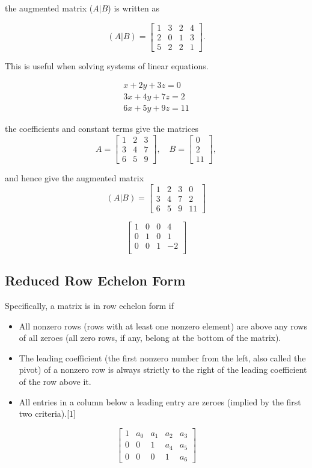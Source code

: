 \documentclass[12pt, a4paper]{article}
\begin{document}
the augmented matrix ($A|B$) is written as

\[
(A|B)=
  \left[\begin{array}{ccc|c}
    1 & 3 & 2 & 4 \\
    2 & 0 & 1 & 3 \\
    5 & 2 & 2 & 1
  \end{array}\right].
\]

This is useful when solving systems of linear equations.


\begin{eqnarray} \nonumber
x + 2y + 3z = 0 \\ \nonumber
3x + 4y + 7z = 2 \\ \nonumber
6x + 5y + 9z = 11 \nonumber
\end{eqnarray}

the coefficients and constant terms give the matrices
\[
A =
\begin{bmatrix}
1 & 2 & 3 \\
3 & 4 & 7 \\
6 & 5 & 9
\end{bmatrix}
, \quad
B =
\begin{bmatrix}
0 \\
2 \\
11
\end{bmatrix},
\]

and hence give the augmented matrix
\[
(A|B) =
  \left[\begin{array}{ccc|c}
1 & 2 & 3 & 0 \\
3 & 4 & 7 & 2 \\
6 & 5 & 9 & 11
  \end{array}\right]
\]

\[\left[\begin{array}{ccc|c}
1 & 0 & 0 & 4 \\
0 & 1 & 0 & 1 \\
0 & 0 & 1 & -2 \\
  \end{array}\right]\]
  
\subsection*{Reduced Row Echelon Form}

Specifically, a matrix is in row echelon form if
\begin{itemize}
\item All nonzero rows (rows with at least one nonzero element) are above any rows of all zeroes (all zero rows, if any, belong at the bottom of the matrix).
\item The leading coefficient (the first nonzero number from the left, also called the pivot) of a nonzero row is always strictly to the right of the leading coefficient of the row above it.
\item All entries in a column below a leading entry are zeroes (implied by the first two criteria).[1]
\end{itemize}
\[\left[ \begin{array}{ccccc}
1 & a_0 & a_1 & a_2 & a_3 \\
0 & 0 & 1 & a_4 & a_5 \\
0 & 0 & 0 & 1 & a_6
\end{array} \right]\]
\newpage
\end{document}
